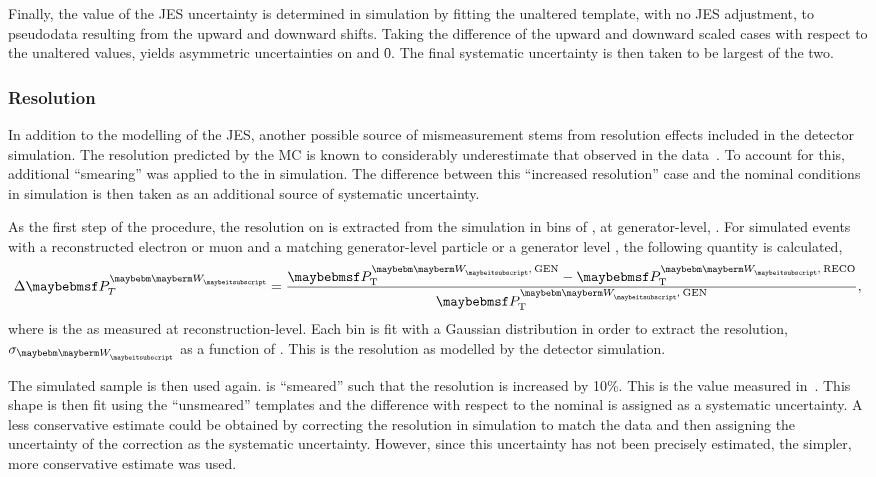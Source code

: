 Finally, the value of the \ac{JES} uncertainty is determined in simulation by
fitting the unaltered template, with no \ac{JES} adjustment, to pseudodata
resulting from the upward and downward shifts. Taking the difference of the
upward and downward scaled cases with respect to the unaltered values, yields
asymmetric uncertainties on \fLmfR and \f0. The final systematic uncertainty is
then taken to be largest of the two.

\subsubsection{\MET Resolution}
In addition to the modelling of the \ac{JES}, another possible source of
mismeasurement stems from resolution effects included in the detector
simulation. The resolution predicted by the \ac{MC} is known to considerably
underestimate that observed in the data~\cite{cms_met_paper,cms_met_pas}. To
account for this, additional ``smearing'' was applied to the \MET in
simulation. The difference between this ``increased resolution'' case and the
nominal conditions in simulation is then taken as an additional source of
systematic uncertainty.

As the first step of the procedure, the resolution on \PtW is extracted from the
simulation in bins of \PtW, at generator-level, \PtWgen . For simulated \Wjets
events with a reconstructed electron or muon and a matching generator-level
particle or a generator level \Ptau, the following quantity is calculated,
\begin{equation*}
\Delta\PtW = \frac{\PtWgen - \PtWreco}{\PtWgen},
\end{equation*}
where \PtWreco is the \PtW as measured at reconstruction-level. Each \PtWgen bin
is fit with a Gaussian distribution in order to extract the resolution,
$\sigma_{\PW}$ as a function of \PtW. This is the \PtW resolution as modelled by
the detector simulation.

The simulated sample is then used again. \PtWreco is ``smeared'' such that the
resolution is increased by 10\%. This is the value measured
in~\cite{cms_met_paper}. This shape is then fit using the ``unsmeared''
templates and the difference with respect to the nominal is assigned as a
systematic uncertainty. A less conservative estimate could be obtained by
correcting the resolution in simulation to match the data and then assigning the
uncertainty of the correction as the systematic uncertainty. However, since this
uncertainty has not been precisely estimated, the simpler, more conservative
estimate was used.

